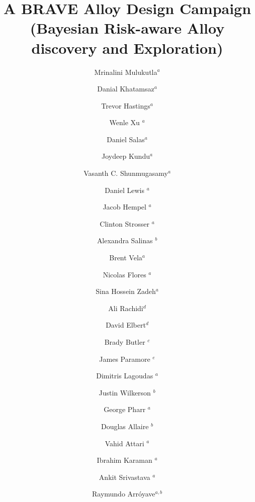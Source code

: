 \documentclass[final,5p,times,twocolumn]{elsarticle}
\begin{document}
\begin{frontmatter}
\title{\Large{A BRAVE Alloy Design Campaign\\
(Bayesian Risk-aware Alloy discovery and Exploration)}}



\author{Mrinalini Mulukutla$^{a}$} 
\author{Danial Khatamsaz$^{a}$}
\author{Trevor Hastings$^{a}$}
\author{Wenle Xu $^{a}$}
\author{Daniel Salas$^{a}$}
\author{Joydeep Kundu$^{a}$}
\author{Vasanth C. Shunmugasamy$^{a}$}
\author{Daniel Lewis $^{a}$}
\author{Jacob Hempel $^{a}$}
\author{Clinton Strosser $^{a}$}
\author{Alexandra Salinas $^{b}$}
\author{Brent Vela$^{a}$}
\author{Nicolas Flores $^{a}$}
\author{Sina Hossein Zadeh$^{a}$}
\author{Ali Rachidi$^{d}$}
\author{David Elbert$^{d}$}
\author{Brady Butler $^{c}$}
\author{James Paramore $^{e}$}
\author{Dimitris Lagoudas $^{a}$}
\author{Justin Wilkerson $^{b}$}
\author{George Pharr $^{a}$}
\author{Douglas Allaire $^{b}$}
\author{Vahid Attari $^{a}$}
\author{Ibrahim Karaman $^{a}$}
\author{Ankit Srivastava $^{a}$}
\author{Raymundo Arr\'{o}yave$^{a,b}$}


\address{$^a$Department of Materials Science and Engineering, Texas A\&M University, College Station, TX 77843, USA}
\address{$^b$Mechanical Engineering Department, Texas A\&M University, College Station, TX, USA 77840}
\address{$^c$DEVCOM Army Research Laboratory South at Texas A\&M University, College Station, TX 77843-3003, USA}
\address{$^d$Hopkins Extreme Materials Institute, Johns Hopkins University, Baltimore, Maryland, 21218, USA}
\address{$^e$Bush Combat Development Complex, Texas A\&M University System, 3479 TAMU, College Station, TX 77843-3479, USA}



\end{frontmatter}
\end{document}
